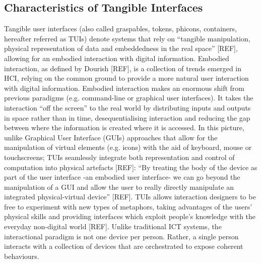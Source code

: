 \subsection{Characteristics of Tangible Interfaces}
Tangible user interfaces (also called graspables, tokens, phicons, containers, hereafter referred as TUIs) denote systems that rely on ``tangible manipulation, physical representation of data and embeddedness in the real space'' [REF], allowing for an embodied interaction with digital information. Embodied interaction, as defined by Dourish [REF], is a collection of trends emerged in HCI, relying on the common ground to provide a more natural user interaction with digital information. Embodied interaction makes an enormous shift from previous paradigms (e.g. command-line or graphical user interfaces). It takes the interaction ``off the screen'' to the real world by distributing inputs and outputs in space rather than in time, desequentialising interaction and reducing the gap between where the information is created where it is accessed. In this picture, unlike Graphical User Interface (GUIs) approaches that allow for the manipulation of virtual elements (e.g. icons) with the aid of keyboard, mouse or touchscreens; TUIs seamlessly integrate both representation and control of computation into physical artefacts [REF]: ``By treating the body of the device as part of the user interface -an embodied user interface- we can go beyond the manipulation of a GUI and allow the user to really directly manipulate an integrated physical-virtual device'' [REF]. TUIs allows interaction designers to be free to experiment with new types of metaphors, taking advantages of the users' physical skills and providing interfaces which exploit people's knowledge with the everyday non-digital world [REF]. Unlike traditional ICT systems, the interactional paradigm is not one device per person. Rather, a single person interacts with a collection of devices that are orchestrated to expose coherent behaviours.
